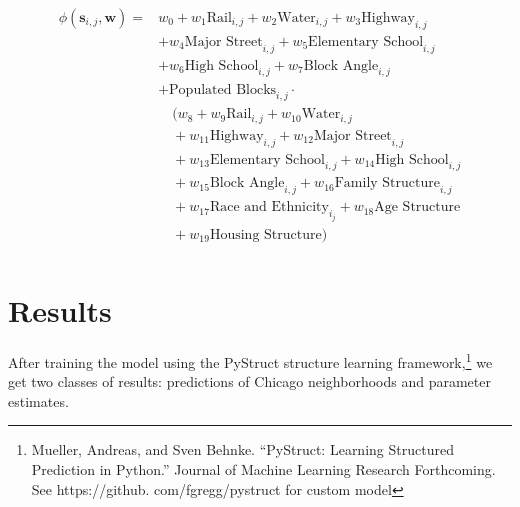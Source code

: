 \documentclass[12pt,letter]{article}\usepackage[]{graphicx}\usepackage[]{color}
\begin{document}
\begin{align}
\phi(\mathbf{s}_{i,j}, \mathbf{w}) =  & w_0 
                                     + w_1\text{Rail}_{i,j} 
                                     + w_2\text{Water}_{i,j} 
                                     + w_3\text{Highway}_{i,j} \\
                                     &+ w_4\text{Major Street}_{i,j} 
                                     + w_5\text{Elementary School}_{i,j}\\ 
                                     & + w_6\text{High School}_{i,j}
                                     + w_7\text{Block Angle}_{i,j} \\
                                     &+ \text{Populated Blocks}_{i,j}\cdot\\
                                     &\quad (w_8
                                     + w_9\text{Rail}_{i,j} 
                                     + w_{10}\text{Water}_{i,j}\\ 
                                     &\quad+ w_{11}\text{Highway}_{i,j}
                                     + w_{12}\text{Major Street}_{i,j}\\ 
                                     &\quad + w_{13}\text{Elementary School}_{i,j} 
                                     + w_{14}\text{High School}_{i,j}\\ 
                                     &\quad + w_{15}\text{Block Angle}_{i,j}
                                     + w_{16}\text{Family Structure}_{i,j}\\
                                     &\quad + w_{17}\text{Race and Ethnicity}_{i_j}
                                     + w_{18}\text{Age Structure}\\  
                                     &\quad+ w_{19}\text{Housing Structure})\\
\end{align}

\section*{Results}
After training the model using the PyStruct structure learning
framework,\footnote{Mueller, Andreas, and Sven Behnke. ``PyStruct:
  Learning Structured Prediction in Python.'' Journal of Machine
  Learning Research Forthcoming. See https://github.
  com/fgregg/pystruct for custom model} we get two classes of results:
predictions of Chicago neighborhoods and parameter estimates.
\end{document}
